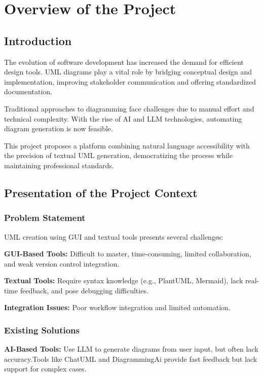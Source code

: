 \chapter[Overview]{Overview of the Project}

\section{Introduction}

The evolution of software development has increased the demand for efficient design tools. UML diagrams play a vital role by bridging conceptual design and implementation, improving stakeholder communication and offering standardized documentation.

Traditional approaches to diagramming face challenges due to manual effort and technical complexity. With the rise of AI and LLM technologies, automating diagram generation is now feasible.

This project proposes a platform combining natural language accessibility with the precision of textual UML generation, democratizing the process while maintaining professional standards.

\section{Presentation of the Project Context}

\subsection{Problem Statement}

UML creation using GUI and textual tools presents several challenges:

\textbf{GUI-Based Tools:} Difficult to master, time-consuming, limited collaboration, and weak version control integration.

\textbf{Textual Tools:} Require syntax knowledge (e.g., PlantUML, Mermaid), lack real-time feedback, and pose debugging difficulties.

\textbf{Integration Issues:} Poor workflow integration and limited automation.

\subsection{Existing Solutions}

\textbf{AI-Based Tools:} Use LLM to generate diagrams from user input, but often lack accuracy.Tools like ChatUML\cite{1} and DiagrammingAi\cite{2} provide fast feedback but lack support for complex cases.

